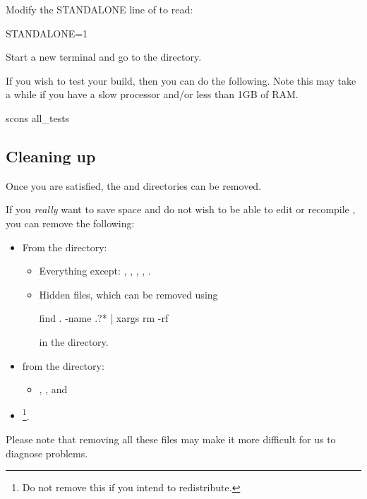 Modify the STANDALONE line of  to read:
 
STANDALONE=1

Start a new terminal and go to the  directory.


If you wish to test your build, then you can do the following. 
Note this may take a while if you have a slow processor and/or less than 1GB of RAM.
\begin{shellCode}
scons all_tests
\end{shellCode}

\subsection{Cleaning up}
Once you are satisfied, the  and  directories can be removed.

If you \emph{really} want to save space and do not wish to be able to edit or recompile \esfinley, you can remove the following:
\begin{itemize}
 \item From the  directory:\begin{itemize}
\item Everything except: , , , ,
.
\item Hidden files, which can be removed using
\begin{shellCode}
find . -name .?* | xargs rm -rf
\end{shellCode}
in the  directory.
\end{itemize}
\item from the  directory:
\begin{itemize}
\item  {}, ,  and 
\end{itemize}
\item {}\footnote{Do not remove this if you intend to redistribute.}.
\end{itemize}

Please note that removing all these files may make it more difficult for us to diagnose problems.


